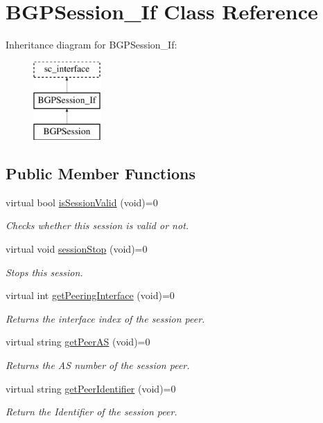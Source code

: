 \hypertarget{classBGPSession__If}{\section{B\-G\-P\-Session\-\_\-\-If Class Reference}
\label{classBGPSession__If}
}
Inheritance diagram for B\-G\-P\-Session\-\_\-\-If\-:\begin{figure}[H]
\begin{center}
\leavevmode
\includegraphics[height=3.000000cm]{classBGPSession__If}
\end{center}
\end{figure}
\subsection*{Public Member Functions}
\begin{DoxyCompactItemize}
\item 
virtual bool \hyperlink{classBGPSession__If_a774c827a52f62d49903daa2781769734}{is\-Session\-Valid} (void)=0
\begin{DoxyCompactList}\small\item\em Checks whether this session is valid or not. \end{DoxyCompactList}\item 
virtual void \hyperlink{classBGPSession__If_a9ba5b4e758982febdc4f71e01aae2b24}{session\-Stop} (void)=0
\begin{DoxyCompactList}\small\item\em Stops this session. \end{DoxyCompactList}\item 
virtual int \hyperlink{classBGPSession__If_aa280e6f0d7267d8fa6584913e54dd9ba}{get\-Peering\-Interface} (void)=0
\begin{DoxyCompactList}\small\item\em Returns the interface index of the session peer. \end{DoxyCompactList}\item 
virtual string \hyperlink{classBGPSession__If_a35753f07e12092da7c4270e45a8271a9}{get\-Peer\-A\-S} (void)=0
\begin{DoxyCompactList}\small\item\em Returns the A\-S number of the session peer. \end{DoxyCompactList}\item 
virtual string \hyperlink{classBGPSession__If_ad831c67d5d824798e18287e16da58967}{get\-Peer\-Identifier} (void)=0
\begin{DoxyCompactList}\small\item\em Return the Identifier of the session peer. \end{DoxyCompactList}\end{DoxyCompactItemize}


